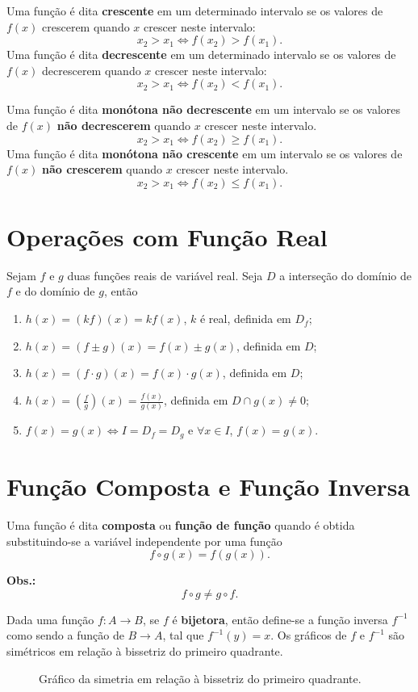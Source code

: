 	Uma função é dita \textbf{crescente} em um determinado intervalo se os valores de $f(x)$ crescerem quando $x$ crescer neste intervalo: \[
		x_2 > x_1 \iff f(x_2) > f(x_1)
	.\] 
	Uma função é dita \textbf{decrescente} em um determinado intervalo se os valores de $f(x)$ decrescerem quando $x$ crescer neste intervalo: \[
		x_2 > x_1 \iff f(x_2) < f(x_1)
	.\] 

	Uma função é dita \textbf{monótona não decrescente} em um intervalo se os valores de $f(x)$ \textbf{não decrescerem} quando $x$ crescer neste intervalo.\[
		x_2 > x_1 \iff f(x_2) \geq f(x_1)
	.\] Uma função é dita \textbf{monótona não crescente} em um intervalo se os valores de $f(x)$ \textbf{não crescerem} quando $x$ crescer neste intervalo.\[
		x_2 > x_1 \iff f(x_2) \leq f(x_1)
	.\] 

	\section{Operações com Função Real}
	\label{sec:operações_com_função_real}
	
	Sejam $f$ e $g$ duas funções reais de variável real. Seja $D$ a interseção do domínio de $f$ e do domínio de $g$, então

	\begin{enumerate}
		\item $h(x) = (kf)(x) = kf(x)$, $k$ é real, definida em $D_f$;
		\item $h(x) = (f \pm g)(x) = f(x) \pm g(x)$, definida em $D$;
		\item $h(x) = (f \cdot g)(x) = f(x) \cdot g(x)$, definida em $D$;
		\item $h(x) = \left(\frac{f}{g}\right)(x) = \frac{f(x)}{g(x)}$, definida em $D \cap g(x) \neq 0$;
		\item $f(x) = g(x) \iff I = D_f = D_g$ e $\forall x \in I$, $f(x) = g(x)$.
	\end{enumerate}
	

	\section{Função Composta e Função Inversa}
	\label{sec:função_composta_e_função_inversa}
	
		Uma função é dita \textbf{composta} ou \textbf{função de função} quando é obtida substituindo-se a variável independente por uma função \[
			f \circ g(x) = f(g(x))
		.\] 

		\textbf{Obs.:} \[
			f \circ g \neq g \circ f
		.\] 
		
		Dada uma função $f:A \rightarrow B$, se $f$ é \textbf{bijetora}, então define-se a função inversa $f^{-1}$ como sendo a função de $B \rightarrow A$, tal que $f^{-1}(y) = x$. Os gráficos de $f$ e $f^{-1}$ são simétricos em relação à bissetriz do primeiro quadrante.

\begin{figure}[ht]
   \centering
	 \caption{Gráfico da simetria em relação à bissetriz do primeiro quadrante.}
   \label{fig:func_inv}
\end{figure}


